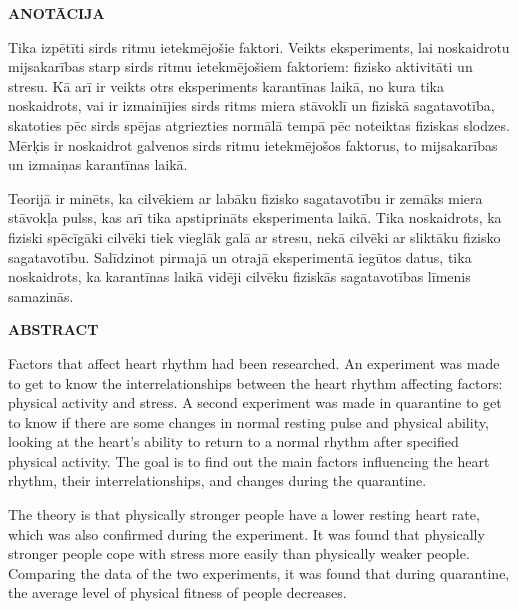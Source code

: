 \documentclass[12pt]{article}
\begin{document}
\begin{titlepage}
\begin{center}
    {\large \bf ANOTĀCIJA}
\end{center}

Tika izpētīti sirds ritmu ietekmējošie faktori. Veikts eksperiments, lai noskaidrotu mijsakarības starp sirds ritmu ietekmējošiem faktoriem: fizisko aktivitāti un stresu. Kā arī ir veikts otrs eksperiments karantīnas laikā, no kura tika noskaidrots, vai ir izmainījies sirds ritms miera stāvoklī un fiziskā sagatavotība, skatoties pēc sirds spējas atgriezties normālā tempā pēc noteiktas fiziskas slodzes. Mērķis ir noskaidrot galvenos sirds ritmu ietekmējošos faktorus, to mijsakarības un izmaiņas karantīnas laikā.\par
Teorijā ir minēts, ka cilvēkiem ar labāku fizisko sagatavotību ir zemāks miera stāvokļa pulss, kas arī tika apstiprināts eksperimenta laikā. Tika noskaidrots, ka fiziski spēcīgāki cilvēki tiek vieglāk galā ar stresu, nekā cilvēki ar sliktāku fizisko sagatavotību. Salīdzinot pirmajā un otrajā eksperimentā iegūtos datus, tika noskaidrots, ka karantīnas laikā vidēji cilvēku fiziskās sagatavotības līmenis samazinās. 

\vspace{4cm}

\begin{center}
    {\large \bf ABSTRACT}
\end{center}

Factors that affect heart rhythm had been researched. An experiment was made to get to know the interrelationships between the heart rhythm affecting factors: physical activity and stress. A second experiment was made in quarantine to get to know if there are some changes in normal resting pulse and physical ability, looking at the heart's ability to return to a normal rhythm after specified physical activity. The goal is to find out the main factors influencing the heart rhythm, their interrelationships, and changes during the quarantine.\par
The theory is that physically stronger people have a lower resting heart rate, which was also confirmed during the experiment. It was found that physically stronger people cope with stress more easily than physically weaker people. Comparing the data of the two experiments, it was found that during quarantine, the average level of physical fitness of people decreases.

\end{titlepage}
\end{document}
